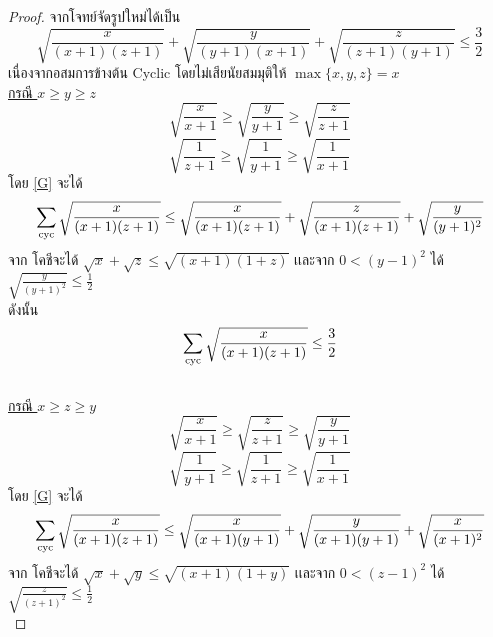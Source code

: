 \documentclass[a4paper,12pt]{scrartcl}
\begin{document}
\begin{proof}จากโจทย์จัดรูปใหม่ได้เป็น
	\[ \sqrt{\frac{x}{(x+1)(z+1)}} + \sqrt{\frac{y}{(y+1)(x+1)}} + \sqrt{\frac{z}{(z+1)(y+1)}} \le \frac{3}{2} \]
  เนื่องจากอสมการข้างต้น Cyclic โดยไม่เสียนัยสมมุติให้ $\max\{x,y,z\} =x$ \\
 \underline{ กรณี $x \ge y \ge z$ } \[ \sqrt{\frac{x}{x+1}} \ge  \sqrt{\frac{y}{y+1}} \ge  \sqrt{\frac{z}{z+1}} \]
 \[ \sqrt{\frac{1}{z+1}} \ge \sqrt{\frac{1}{y+1}} \ge \sqrt{\frac{1}{x+1}} \]
 โดย \ref{G} จะได้
 \[ \sum_{\mathrm{cyc}} \sqrt{\frac{x}{(x+1)(z+1)}} \le \sqrt{\frac{x}{(x+1)(z+1)}} + \sqrt{\frac{z}{(x+1)(z+1)}} + \sqrt{\frac{y}{(y+1)^2}} \]
 จาก โคชีจะได้ $\sqrt{x} + \sqrt{z} \le \sqrt{(x+1)(1+z)} $ เเละจาก $0<(y-1)^2$ ได้ 
 $\sqrt{\frac{y}{(y+1)^2}} \le \frac{1}{2}$ \\
 ดังนั้น\[ \sum_{\mathrm{cyc}} \sqrt{\frac{x}{(x+1)(z+1)}} \le \frac{3}{2} \] \\
  \underline{ กรณี $x \ge z \ge y$ } 
\[ \sqrt{\frac{x}{x+1}} \ge  \sqrt{\frac{z}{z+1}} \ge  \sqrt{\frac{y}{y+1}} \]
 \[ \sqrt{\frac{1}{y+1}} \ge \sqrt{\frac{1}{z+1}} \ge \sqrt{\frac{1}{x+1}} \]
 โดย \ref{G} จะได้
 \[ \sum_{\mathrm{cyc}} \sqrt{\frac{x}{(x+1)(z+1)}} \le \sqrt{\frac{x}{(x+1)(y+1)}} + \sqrt{\frac{y}{(x+1)(y+1)}} + \sqrt{\frac{x}{(x+1)^2}} \]
 จาก โคชีจะได้ $\sqrt{x} + \sqrt{y} \le \sqrt{(x+1)(1+y)} $ เเละจาก $0<(z-1)^2$ ได้ 
 $\sqrt{\frac{z}{(z+1)^2}} \le \frac{1}{2}$ \\
\end{proof}
\end{document}
